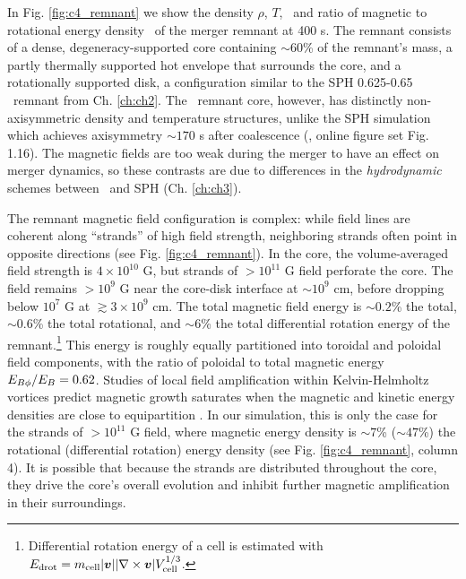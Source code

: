 In Fig. \ref{fig:c4_remnant} we show the density $\rho$, $T$, \Bmag\ and ratio of magnetic to rotational energy density \eberot\ of the merger remnant at 400 s.  The remnant consists of a dense, degeneracy-supported core containing $\sim60$\% of the remnant's mass, a partly thermally supported hot envelope that surrounds the core, and a rotationally supported disk, a configuration similar to the SPH 0.625-0.65 \Msun\ remnant from Ch. \ref{ch:ch2}.  The \arepo\ remnant core, however, has distinctly non-axisymmetric density and temperature structures, unlike the SPH simulation which achieves axisymmetry $\sim170$ s after coalescence (\citealt{zhu+13}, online figure set Fig. 1.16).  The magnetic fields are too weak during the merger to have an effect on merger dynamics, so these contrasts are due to differences in the \textit{hydrodynamic} schemes between \arepo\ and SPH (Ch. \ref{ch:ch3}).



The remnant magnetic field configuration is complex: while field lines are coherent along ``strands'' of high field strength, neighboring strands often point in opposite directions (see Fig. \ref{fig:c4_remnant}).  In the core, the volume-averaged field strength is $4\times10^{10}$ G, but strands of $>10^{11}$ G field perforate the core.  The field remains $>10^9$ G near the core-disk interface at $\sim 10^9$ cm, before dropping below $10^7$ G at $\gtrsim 3\times10^9$ cm.  The total magnetic field energy is $\sim0.2$\% the total, $\sim0.6$\% the total rotational, and $\sim6$\% the total differential rotation energy of the remnant.\footnote{Differential rotation energy of a cell is estimated with $E_\mathrm{drot} = m_\mathrm{cell}|\boldsymbol{v}||\nabla\times\boldsymbol{v}|V_\mathrm{cell}^{1/3}$.}  This energy is roughly equally partitioned into toroidal and poloidal field components, with the ratio of poloidal to total magnetic energy $\EBphiEB = 0.62$.  Studies of local field amplification within Kelvin-Helmholtz vortices predict magnetic growth saturates when the magnetic and kinetic energy densities are close to equipartition \citep{oberam10, zrakm13}.  In our simulation, this is only the case for the strands of $>10^{11}$ G field, where magnetic energy density is $\sim7$\% ($\sim47$\%) the rotational (differential rotation) energy density (see Fig. \ref{fig:c4_remnant}, column 4).  It is possible that because the strands are distributed throughout the core, they drive the core's overall evolution and inhibit further magnetic amplification in their surroundings.

